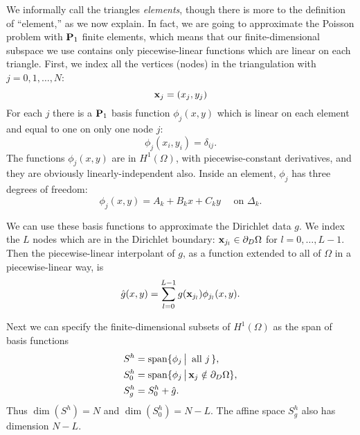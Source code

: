 We informally call the triangles \emph{elements}, though there is more to the definition of ``element,'' as we now explain.  In fact, we are going to approximate the Poisson problem with $\mathbf{P}_1$ finite elements, which means that our finite-dimensional subspace we use contains only piecewise-linear functions which are linear on each triangle.  First, we index all the vertices (nodes) in the triangulation with $j=0,1,\dots,N$:
\begin{equation*}
\mathbf{x}_j = (x_j,y_j)
\end{equation*}
For each $j$ there is a $\mathbf{P}_1$ basis function $\phi_j(x,y)$ which is linear on each element and equal to one on only one node $j$:
\begin{equation*}
\phi_j(x_i,y_i) = \delta_{ij}.
\end{equation*}
The functions $\phi_j(x,y)$ are in $H^1(\Omega)$, with piecewise-constant derivatives, and they are obviously linearly-independent also.
Inside an element, $\phi_j$ has three degrees of freedom:
\begin{equation*}
\phi_j(x,y) = A_k + B_k x + C_k y \quad \text{ on } \Delta_k.
\end{equation*}

We can use these basis functions to approximate the Dirichlet data $g$.  We index the $L$ nodes which are in the Dirichlet boundary: $\mathbf{x}_{j_l} \in \partial_D\Omega$ for $l=0,\dots,L-1$. Then the piecewise-linear interpolant of $g$, as a function extended to all of $\Omega$ in a piecewise-linear way, is
\begin{equation*}
\hat g(x,y) = \sum_{l=0}^{L-1} g(\mathbf{x}_{j_l}) \phi_{j_l}(x,y).
\end{equation*}

Next we can specify the finite-dimensional subsets of $H^1(\Omega)$ as the span of basis functions
\begin{align*}
S^h &= \operatorname{span}\{\phi_j \,\big|\, \text{ all } j\,\}, \\
S_0^h &= \operatorname{span}\{\phi_j \,\big|\, \mathbf{x}_j \notin \partial_D \Omega\}, \\
S_g^h &= S_0^h + \hat g.
\end{align*}
Thus $\dim(S^h)=N$ and $\dim(S_0^h)=N-L$.  The affine space $S_g^h$ also has dimension $N-L$.


